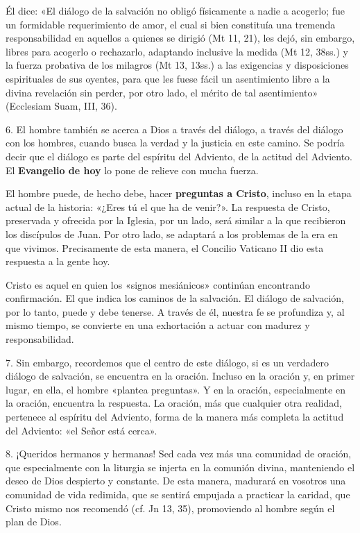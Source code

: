 \documentclass[]{article}
\begin{document}
Él dice: «El diálogo de la salvación no obligó físicamente a nadie a
acogerlo; fue un formidable requerimiento de amor, el cual si bien
constituía una tremenda responsabilidad en aquellos a quienes se dirigió
(Mt 11, 21), les dejó, sin embargo, libres para acogerlo o rechazarlo,
adaptando inclusive la medida (Mt 12, 38ss.) y la fuerza probativa de
los milagros (Mt 13, 13ss.) a las exigencias y disposiciones
espirituales de sus oyentes, para que les fuese fácil un asentimiento
libre a la divina revelación sin perder, por otro lado, el mérito de tal
asentimiento» (Ecclesiam Suam, III, 36).

6. El hombre también se acerca a Dios a través del diálogo, a través del
diálogo con los hombres, cuando busca la verdad y la justicia en este
camino. Se podría decir que el diálogo es parte del espíritu del
Adviento, de la actitud del Adviento. El \textbf{Evangelio de hoy} lo
pone de relieve con mucha fuerza.

El hombre puede, de hecho debe, hacer \textbf{preguntas a Cristo},
incluso en la etapa actual de la historia: «¿Eres tú el que ha de
venir?». La respuesta de Cristo, preservada y ofrecida por la Iglesia,
por un lado, será similar a la que recibieron los discípulos de Juan.
Por otro lado, se adaptará a los problemas de la era en que vivimos.
Precisamente de esta manera, el Concilio Vaticano II dio esta respuesta
a la gente hoy.

Cristo es aquel en quien los «signos mesiánicos» continúan encontrando
confirmación. El que indica los caminos de la salvación. El diálogo de
salvación, por lo tanto, puede y debe tenerse. A través de él, nuestra
fe se profundiza y, al mismo tiempo, se convierte en una exhortación a
actuar con madurez y responsabilidad.

7. Sin embargo, recordemos que el centro de este diálogo, si es un
verdadero diálogo de salvación, se encuentra en la oración. Incluso en
la oración y, en primer lugar, en ella, el hombre «plantea preguntas». Y
en la oración, especialmente en la oración, encuentra la respuesta. La
oración, más que cualquier otra realidad, pertenece al espíritu del
Adviento, forma de la manera más completa la actitud del Adviento: «el
Señor está cerca».

8. ¡Queridos hermanos y hermanas! Sed cada vez más una comunidad de
oración, que especialmente con la liturgia se injerta en la comunión
divina, manteniendo el deseo de Dios despierto y constante. De esta
manera, madurará en vosotros una comunidad de vida redimida, que se
sentirá empujada a practicar la caridad, que Cristo mismo nos recomendó
(cf. Jn 13, 35), promoviendo al hombre según el plan de Dios.
\end{document}
